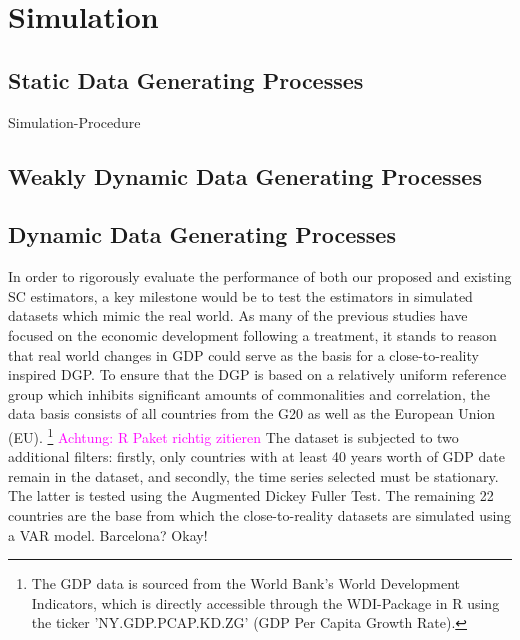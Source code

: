 \section{Simulation}

\subsection{Static Data Generating Processes}

Simulation-Procedure


\subsection{Weakly Dynamic Data Generating Processes}
\subsection{Dynamic Data Generating Processes}
In order to rigorously evaluate the performance of both our proposed and existing SC estimators, a key milestone would be to test the estimators in simulated datasets which mimic the real world. As many of the previous studies have focused on the economic development following a treatment, it stands to reason that real world changes in GDP could serve as the basis for a close-to-reality inspired DGP.
To ensure that the DGP is based on a relatively uniform reference group which inhibits significant amounts of commonalities and correlation, the data basis consists of all countries from the G20 as well as the European Union (EU). \footnote{The GDP data is sourced from the World Bank's World Development Indicators, which is directly accessible through the WDI-Package in R using the ticker 'NY.GDP.PCAP.KD.ZG' (GDP Per Capita Growth Rate).} 
\textcolor{magenta}{Achtung: R Paket richtig zitieren}
The dataset is subjected to two additional filters: firstly, only countries with at least 40 years worth of GDP date remain in the dataset, and secondly, the time series selected must be stationary. The latter is tested using the Augmented Dickey Fuller Test. The remaining 22 countries are the base from which the close-to-reality datasets are simulated using a VAR model. Barcelona? Okay!
